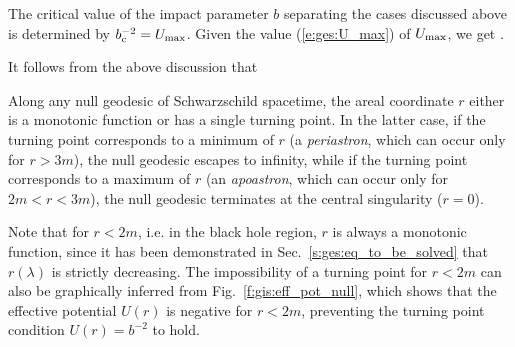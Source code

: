 The critical value of the impact parameter $b$ separating the cases discussed
above is determined by $b_{\rm c}^{-2} = U_{\rm max}$.
Given the value (\ref{e:ges:U_max}) of $U_{\rm max}$, we get
\be \label{e:ges:b_crit}
    .
\ee

It follows from the above discussion that
\begin{greybox}
Along any null geodesic of Schwarzschild spacetime, the areal coordinate $r$
either is a monotonic function or has a single turning point. In the latter case,
if the turning point corresponds to a minimum of $r$ (a \emph{periastron}, which can occur
only for $r>3m$), the null geodesic escapes to infinity, while if the turning
point corresponds to a maximum of $r$ (an \emph{apoastron}, which can occur only for $2m<r<3m$), the
null geodesic terminates at the central singularity ($r=0$).
\end{greybox}
Note that for $r<2m$, i.e. in the black hole region, $r$
is always a monotonic function, since it has been demonstrated in
Sec.~\ref{s:ges:eq_to_be_solved} that $r(\lambda)$ is strictly
decreasing. The impossibility of a turning point for $r<2m$ can also be
graphically inferred from Fig.~\ref{f:gis:eff_pot_null}, which shows
that the effective potential $U(r)$ is negative for $r<2m$,
preventing the turning point condition $U(r) = b^{-2}$ to hold.


